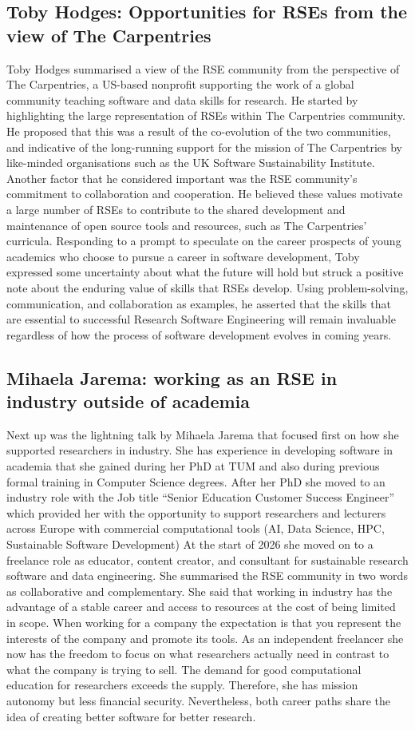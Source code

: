 \documentclass{eceasst}
\begin{document}
\subsection{Toby Hodges: Opportunities for RSEs from the view of The Carpentries}
Toby Hodges summarised a view of the RSE community from the perspective of The Carpentries, 
a US-based nonprofit supporting the work of a global community teaching software and data skills for research.
He started by highlighting the large representation of RSEs within The Carpentries community.
He proposed that this was a result of the co-evolution of the two communities, 
and indicative of the long-running support for the mission of The Carpentries by like-minded organisations
such as the UK Software Sustainability Institute.
Another factor that he considered important was the RSE community's commitment to collaboration and cooperation.
He believed these values motivate a large number of RSEs to contribute to the shared development and maintenance of 
open source tools and resources,
such as The Carpentries' curricula.
Responding to a prompt to speculate on the career prospects of young academics who choose to pursue a career in software development,
Toby expressed some uncertainty about what the future will hold but struck a positive note about the enduring value of skills that RSEs develop.
Using problem-solving, communication, and collaboration as examples, 
he asserted that the skills that are essential to successful Research Software Engineering will remain invaluable
regardless of how the process of software development evolves in coming years.

\subsection{Mihaela Jarema: working as an RSE in industry outside of academia}
Next up was the lightning talk by Mihaela Jarema that focused first on how she supported researchers in industry.
She has experience in developing software in academia that she gained during her PhD at TUM and also during previous formal training in
Computer Science degrees.
After her PhD she moved to an industry role with the Job title ``Senior Education Customer Success Engineer''
which provided her with the opportunity to support researchers and lecturers across Europe with commercial
computational tools (AI, Data Science, HPC, Sustainable Software Development)
At the start of 2026 she moved on to a freelance role
as educator, content creator, and consultant for sustainable research software and data engineering.
She summarised the RSE community in two words as collaborative and complementary.
She said that working in industry has the advantage of a stable career and access to resources at the cost of being limited in scope.
When working for a company the expectation is that you represent the interests of the company and promote its tools.
As an independent freelancer she now has the freedom to focus on what researchers actually need in contrast to what the company is trying to sell.
The demand for good computational education for researchers exceeds the supply.
Therefore, she has mission autonomy but less financial security.
Nevertheless, both career paths share the idea of creating better software for better research.
\end{document}
